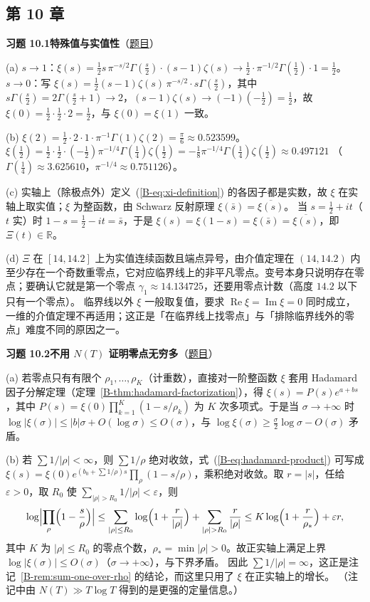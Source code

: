 \documentclass[11pt,a4paper]{article}
\newcommand{\RR}{\mathbb{R}}
\renewcommand{\Re}{\operatorname{Re}}
\renewcommand{\Im}{\operatorname{Im}}
\newcommand{\bref}[1]{\ref*{B-#1}}
\newcommand{\Sol}[2]{%
  \par\addvspace{1.2em}\noindent
  \hypertarget{s:#1}{}\textbf{习题 #1\quad #2}\hfill{\small（\hyperlink{q:#1}{题目}）}\par
  \nopagebreak\smallskip}
\begin{document}
\subsection*{第 10 章}

\Sol{10.1}{特殊值与实值性}
(a) $s\to1$：$\xi(s)=\frac12s\,\pi^{-s/2}\Gamma(\frac s2)\cdot(s-1)\zeta(s)\to\frac12\cdot\pi^{-1/2}\Gamma(\frac12)\cdot1=\frac12$。
$s\to0$：写 $\xi(s)=\frac12(s-1)\zeta(s)\,\pi^{-s/2}\cdot s\Gamma(\frac s2)$，其中 $s\Gamma(\frac s2)=2\Gamma(\frac s2+1)\to2$，$(s-1)\zeta(s)\to(-1)(-\frac12)=\frac12$，故 $\xi(0)=\frac12\cdot\frac12\cdot2=\frac12$，与 $\xi(0)=\xi(1)$ 一致。

(b) $\xi(2)=\frac12\cdot2\cdot1\cdot\pi^{-1}\Gamma(1)\zeta(2)=\frac{\pi}{6}\approx0.523599$。
$\xi(\frac12)=\frac12\cdot\frac12\cdot(-\frac12)\pi^{-1/4}\Gamma(\frac14)\zeta(\frac12)=-\frac18\pi^{-1/4}\Gamma(\frac14)\zeta(\frac12)\approx0.497121$
（$\Gamma(\frac14)\approx3.625610$，$\pi^{-1/4}\approx0.751126$）。

(c) 实轴上（除极点外）定义~(\bref{eq:xi-definition}) 的各因子都是实数，故 $\xi$ 在实轴上取实值；$\xi$ 为整函数，由 Schwarz 反射原理 $\xi(\bar s)=\overline{\xi(s)}$。
当 $s=\frac12+it$（$t$ 实）时 $1-s=\frac12-it=\bar s$，于是
$\xi(s)=\xi(1-s)=\xi(\bar s)=\overline{\xi(s)}$，即 $\Xi(t)\in\RR$。

(d) $\Xi$ 在 $[14,14.2]$ 上为实值连续函数且端点异号，由介值定理在 $(14,14.2)$ 内至少存在一个奇数重零点，它对应临界线上的非平凡零点。变号本身只说明存在零点；要确认它就是第一个零点 $\gamma_1\approx14.134725$，还要用零点计数（高度 $14.2$ 以下只有一个零点）。
临界线以外 $\xi$ 一般取复值，要求 $\Re\xi=\Im\xi=0$ 同时成立，一维的介值定理不再适用；这正是「在临界线上找零点」与「排除临界线外的零点」难度不同的原因之一。

\Sol{10.2}{不用 $N(T)$ 证明零点无穷多}
(a) 若零点只有有限个 $\rho_1,\dots,\rho_K$（计重数），直接对一阶整函数 $\xi$ 套用 Hadamard 因子分解定理（定理~\bref{thm:hadamard-factorization}），得 $\xi(s)=P(s)e^{a+bs}$，其中 $P(s)=\xi(0)\prod_{k=1}^K(1-s/\rho_k)$ 为 $K$ 次多项式。于是当 $\sigma\to+\infty$ 时 $\log|\xi(\sigma)|\le|b|\sigma+O(\log\sigma)\le O(\sigma)$，与 $\log\xi(\sigma)\ge\frac\sigma2\log\sigma-O(\sigma)$ 矛盾。

(b) 若 $\sum1/|\rho|<\infty$，则 $\sum1/\rho$ 绝对收敛，式~(\bref{eq:hadamard-product}) 可写成
$\xi(s)=\xi(0)e^{(b_0+\sum1/\rho)s}\prod_\rho(1-s/\rho)$，乘积绝对收敛。取 $r=|s|$，任给 $\varepsilon>0$，取 $R_0$ 使 $\sum_{|\rho|>R_0}1/|\rho|<\varepsilon$，则
\[
  \log\Bigl|\prod_\rho\Bigl(1-\frac s\rho\Bigr)\Bigr|
  \le\sum_{|\rho|\le R_0}\log\Bigl(1+\frac r{|\rho|}\Bigr)+\sum_{|\rho|>R_0}\frac r{|\rho|}
  \le K\log\Bigl(1+\frac r{\rho_*}\Bigr)+\varepsilon r ,
\]
其中 $K$ 为 $|\rho|\le R_0$ 的零点个数，$\rho_*=\min|\rho|>0$。故正实轴上满足上界 $\log|\xi(\sigma)|\le O(\sigma)$（$\sigma\to+\infty$），与下界矛盾。
因此 $\sum1/|\rho|=\infty$，这正是注记~\bref{rem:sum-one-over-rho} 的结论，而这里只用了 $\xi$ 在正实轴上的增长。
（注记中由 $N(T)\gg T\log T$ 得到的是更强的定量信息。）
\end{document}
